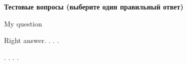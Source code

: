 \documentclass[12pt, table]{exam}
\begin{document}
\pagebreak
\noindent\textbf{Тестовые вопросы (выберите один правильный ответ)}

\begin{questions}
\begin{multicols}{2}
\setlength{\columnsep}{1cm}
\question My question
\begin{choices}
	\CC Right answer.
	\choice .
	\choice .
	\choice .
\end{choices}

\question 
\begin{choices}
	\CC .
	\choice .
	\choice .
	\choice .
\end{choices}


\end{multicols}
\end{questions}
\end{document}
